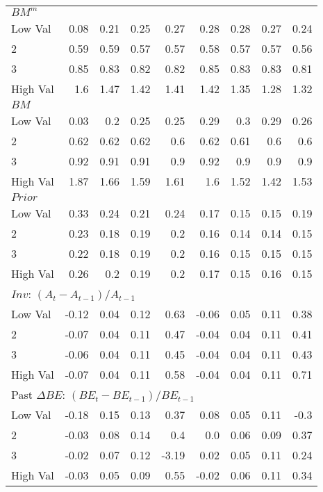 \begin{table}[ht]
{\begin{tabular}{lrrrrrrrr}
    \multicolumn{9}{l}{$BM^m$} \\
    Low Val    & 0.08  & 0.21  & 0.25  & 0.27  & 0.28  & 0.28  & 0.27  & 0.24  \\
           2   & 0.59  & 0.59  & 0.57  & 0.57  & 0.58  & 0.57  & 0.57  & 0.56  \\
           3   & 0.85  & 0.83  & 0.82  & 0.82  & 0.85  & 0.83  & 0.83  & 0.81  \\
    High Val   & 1.6  & 1.47  & 1.42  & 1.41  & 1.42  & 1.35  & 1.28  & 1.32  \\
    [1em]
  

    \multicolumn{9}{l}{$BM$} \\
    Low Val    & 0.03  & 0.2  & 0.25  & 0.25  & 0.29  & 0.3  & 0.29  & 0.26  \\
           2   & 0.62  & 0.62  & 0.62  & 0.6  & 0.62  & 0.61  & 0.6  & 0.6  \\
           3   & 0.92  & 0.91  & 0.91  & 0.9  & 0.92  & 0.9  & 0.9  & 0.9  \\
    High Val   & 1.87  & 1.66  & 1.59  & 1.61  & 1.6  & 1.52  & 1.42  & 1.53  \\
    [1em]
  

    \multicolumn{9}{l}{$Prior$} \\
    Low Val    & 0.33  & 0.24  & 0.21  & 0.24  & 0.17  & 0.15  & 0.15  & 0.19  \\
           2   & 0.23  & 0.18  & 0.19  & 0.2  & 0.16  & 0.14  & 0.14  & 0.15  \\
           3   & 0.22  & 0.18  & 0.19  & 0.2  & 0.16  & 0.15  & 0.15  & 0.15  \\
    High Val   & 0.26  & 0.2  & 0.19  & 0.2  & 0.17  & 0.15  & 0.16  & 0.15  \\
    [1em]
  

    \multicolumn{9}{l}{$Inv$: $(A_t - A_{t-1}) / A_{t-1}$} \\
    Low Val    & -0.12  & 0.04  & 0.12  & 0.63  & -0.06  & 0.05  & 0.11  & 0.38  \\
           2   & -0.07  & 0.04  & 0.11  & 0.47  & -0.04  & 0.04  & 0.11  & 0.41  \\
           3   & -0.06  & 0.04  & 0.11  & 0.45  & -0.04  & 0.04  & 0.11  & 0.43  \\
    High Val   & -0.07  & 0.04  & 0.11  & 0.58  & -0.04  & 0.04  & 0.11  & 0.71  \\
    [1em]
  

    \multicolumn{9}{l}{Past $\Delta BE$: $(BE_t - BE_{t-1}) / BE_{t-1}$} \\
    Low Val    & -0.18  & 0.15  & 0.13  & 0.37  & 0.08  & 0.05  & 0.11  & -0.3  \\
           2   & -0.03  & 0.08  & 0.14  & 0.4  & 0.0  & 0.06  & 0.09  & 0.37  \\
           3   & -0.02  & 0.07  & 0.12  & -3.19  & 0.02  & 0.05  & 0.11  & 0.24  \\
    High Val   & -0.03  & 0.05  & 0.09  & 0.55  & -0.02  & 0.06  & 0.11  & 0.34  \\
    [1em]
  


\end{tabular}}
\end{table}

